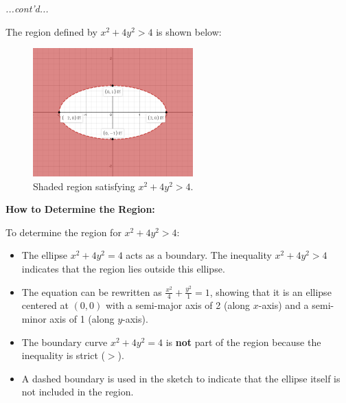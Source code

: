 \documentclass{article}
\begin{document}
\begin{examplebox}
\textit{...cont'd...}
\begin{solutionbox}
    The region defined by \( x^2 + 4y^2 > 4 \) is shown below:

    \begin{blankbox}
    \begin{figure}[H]
        \centering
        \includegraphics[width=0.55\textwidth]{x^2 + 4y^2 gt 4 region.png}
        \caption{Shaded region satisfying \( x^2 + 4y^2 > 4 \).}
        \label{fig:ellipse_region}
    \end{figure}
    \end{blankbox}

    \textbf{How to Determine the Region:}
    \begin{conceptbox}
    To determine the region for \( x^2 + 4y^2 > 4 \):
    \begin{itemize}
        \item The ellipse \( x^2 + 4y^2 = 4 \) acts as a boundary. The inequality \( x^2 + 4y^2 > 4 \) indicates that the region lies outside this ellipse.
        \item The equation can be rewritten as \( \frac{x^2}{4} + \frac{y^2}{1} = 1 \), showing that it is an ellipse centered at \( (0,0) \) with a semi-major axis of 2 (along \( x \)-axis) and a semi-minor axis of 1 (along \( y \)-axis).
        \item The boundary curve \( x^2 + 4y^2 = 4 \) is \textbf{not} part of the region because the inequality is strict (\( > \)).
        \item A dashed boundary is used in the sketch to indicate that the ellipse itself is not included in the region.
    \end{itemize}
    \end{conceptbox}
\end{solutionbox}    
\end{examplebox}
\end{document}
